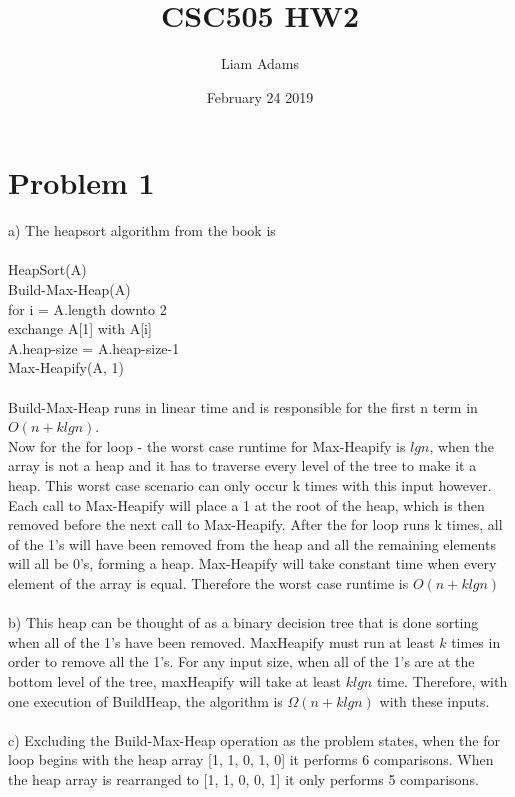 \documentclass{article}
\title{CSC505 HW2}
\author{Liam Adams}
\date{February 24 2019}
\begin{document}
\maketitle

\section*{Problem 1}
a) The heapsort algorithm from the book is \\\\
HeapSort(A)\\
\-\hspace{1cm}Build-Max-Heap(A)\\
\-\hspace{1cm}for i = A.length downto 2\\
\-\hspace{2cm}exchange A[1] with A[i]\\
\-\hspace{2cm}A.heap-size = A.heap-size-1\\
\-\hspace{2cm}Max-Heapify(A, 1)\\\\
Build-Max-Heap runs in linear time and is responsible for the first n term in $O(n + klgn)$.\\ Now for the for loop - the worst case runtime for Max-Heapify is $lgn$, when the array is not a heap and it has to traverse every level of the tree to make it a heap.  This worst case scenario can only occur k times with this input however.  Each call to Max-Heapify will place a 1 at the root of the heap, which is then removed before the next call to Max-Heapify.  After the for loop runs k times, all of the 1's will have been removed from the heap and all the remaining elements will all be 0's, forming a heap.  Max-Heapify will take constant time when every element of the array is equal.  Therefore the worst case runtime is $O(n + klgn)$\\\\
b) This heap can be thought of as a binary decision tree that is done sorting when all of the 1's have been removed.  MaxHeapify must run at least $k$ times in order to remove all the 1's.  For any input size, when all of the 1's are at the bottom level of the tree, maxHeapify will take at least $klgn$ time.  Therefore, with one execution of BuildHeap, the algorithm is $\Omega(n+klgn)$ with these inputs.\\\\
c) Excluding the Build-Max-Heap operation as the problem states, when the for loop begins with the heap array [1, 1, 0, 1, 0] it performs 6 comparisons.  When the heap array is rearranged to [1, 1, 0, 0, 1] it only performs 5 comparisons.\\\\
\end{document}
